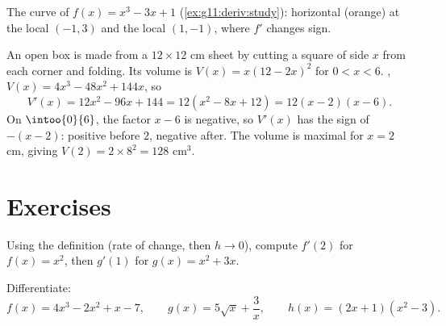 \begin{omfigure}

{\small The curve of $f(x) = x^3 - 3x + 1$
(\cref{ex:g11:deriv:study}): horizontal  (orange) at the local
 $(-1, 3)$ and the local  $(1, -1)$, where $f'$ changes
sign.}
\end{omfigure}

\begin{example}[Optimization]\label{ex:g11:deriv:box}
An open box is made from a $12 \times 12$ cm sheet by cutting a square of
side $x$ from each corner and folding. Its volume is
$V(x) = x(12 - 2x)^2$ for $0 < x < 6$. ,
$V(x) = 4x^3 - 48x^2 + 144x$, so
\[
V'(x) = 12x^2 - 96x + 144 = 12(x^2 - 8x + 12) = 12(x - 2)(x - 6).
\]
On $\intoo{0}{6}$, the factor $x - 6$ is negative, so $V'(x)$ has the sign
of $-(x-2)$: positive before $2$, negative after. The volume is maximal
for $x = 2$ cm, giving $V(2) = 2 \times 8^2 = 128$ cm$^3$.
\end{example}

\section{Exercises}

\begin{exercise}[$\star$]\label{exo:g11:deriv:1}
Using the definition (rate of change, then $h \to 0$), compute $f'(2)$ for
$f(x) = x^2$, then $g'(1)$ for $g(x) = x^2 + 3x$.
\end{exercise}

\begin{exercise}[$\star$]\label{exo:g11:deriv:2}
Differentiate:
\[
f(x) = 4x^3 - 2x^2 + x - 7, \qquad
g(x) = 5\sqrt{x} + \frac{3}{x}, \qquad
h(x) = (2x+1)(x^2 - 3) .
\]
\end{exercise}


